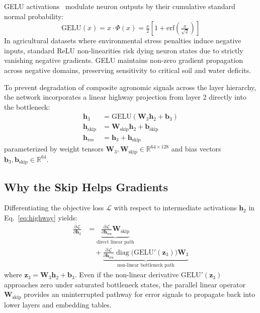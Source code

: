 \documentclass[conference,10pt,letterpaper]{IEEEtran}
\begin{document}
GELU activations~\cite{hendrycks2016gaussian} modulate neuron outputs by their cumulative standard normal probability:
\begin{equation}
\text{GELU}(x) = x \cdot \Phi(x) = \tfrac{x}{2}\left[1 + \text{erf}\!\left(\tfrac{x}{\sqrt{2}}\right)\right]
\end{equation}
In agricultural datasets where environmental stress penalties induce negative inputs, standard ReLU non-linearities risk dying neuron states due to strictly vanishing negative gradients. GELU maintains non-zero gradient propagation across negative domains, preserving sensitivity to critical soil and water deficits.

To prevent degradation of composite agronomic signals across the layer hierarchy, the network incorporates a linear highway projection from layer 2 directly into the bottleneck:
\begin{align}
\mathbf{h}_3 &= \text{GELU}(\mathbf{W}_3 \mathbf{h}_2 + \mathbf{b}_3) \\
\mathbf{h}_{\text{skip}} &= \mathbf{W}_{\text{skip}} \mathbf{h}_2 + \mathbf{b}_{\text{skip}} \\
\mathbf{h}_{\text{res}} &= \mathbf{h}_3 + \mathbf{h}_{\text{skip}} \label{eq:highway}
\end{align}
parameterized by weight tensors $\mathbf{W}_3, \mathbf{W}_{\text{skip}} \in \mathbb{R}^{64 \times 128}$ and bias vectors $\mathbf{b}_3, \mathbf{b}_{\text{skip}} \in \mathbb{R}^{64}$.

\subsection{Why the Skip Helps Gradients}
Differentiating the objective loss $\mathcal{L}$ with respect to intermediate activations $\mathbf{h}_2$ in Eq.~\eqref{eq:highway} yields:
\begin{equation}
\begin{aligned}
\frac{\partial \mathcal{L}}{\partial \mathbf{h}_2}
&= \underbrace{\frac{\partial \mathcal{L}}{\partial \mathbf{h}_{\text{res}}} \mathbf{W}_{\text{skip}}}_{\text{direct linear path}} \\
&\quad + \underbrace{\frac{\partial \mathcal{L}}{\partial \mathbf{h}_{\text{res}}} \operatorname{diag}\!\big(\text{GELU}'(\mathbf{z}_3)\big)\mathbf{W}_3}_{\text{non-linear bottleneck path}}
\end{aligned}
\end{equation}
where $\mathbf{z}_3 = \mathbf{W}_3 \mathbf{h}_2 + \mathbf{b}_3$. Even if the non-linear derivative $\text{GELU}'(\mathbf{z}_3)$ approaches zero under saturated bottleneck states, the parallel linear operator $\mathbf{W}_{\text{skip}}$ provides an uninterrupted pathway for error signals to propagate back into lower layers and embedding tables.
\end{document}
